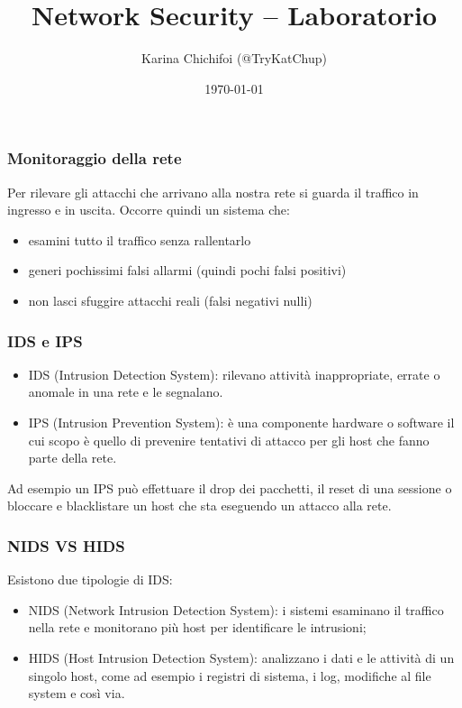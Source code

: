 \documentclass[aspectratio=169]{beamer}
\title{Network Security -- Laboratorio}
\author{Karina Chichifoi (@TryKatChup)}
\date{\today}
\begin{document}
 	\maketitle

	\begin{frame}
		\frametitle{Monitoraggio della rete}
		Per rilevare gli attacchi che arrivano alla nostra rete si guarda il traffico in ingresso e in uscita. Occorre quindi un sistema che:
		\begin{itemize}
		    \item esamini tutto il traffico senza rallentarlo
		    \item generi pochissimi falsi allarmi (quindi pochi falsi positivi)
		    \item non lasci sfuggire attacchi reali (falsi negativi nulli)
		\end{itemize}
	\end{frame}

	\begin{frame}
		\frametitle{IDS e IPS}
	    \begin{itemize}
	        \item IDS (Intrusion Detection System): rilevano attività inappropriate, errate o anomale in una rete e le segnalano.
	        \item IPS (Intrusion Prevention System): è una componente hardware o software il cui scopo è quello di prevenire tentativi di attacco per gli host che fanno parte della rete.
	    \end{itemize}
	    Ad esempio un IPS può effettuare il drop dei pacchetti, il reset di una sessione o bloccare e blacklistare un host che sta eseguendo un attacco alla rete.
	\end{frame} 
    
    \begin{frame}
        \frametitle{NIDS VS HIDS}
        Esistono due tipologie di IDS:
        \begin{itemize}
            \item NIDS (Network Intrusion Detection System): i sistemi esaminano il traffico nella rete e monitorano più host per identificare le intrusioni;
            \item HIDS (Host Intrusion Detection System): analizzano i dati e le attività di un singolo host, come ad esempio i registri di sistema, i log, modifiche al file system e così via.
        \end{itemize}
    \end{frame}
    
\end{document}
